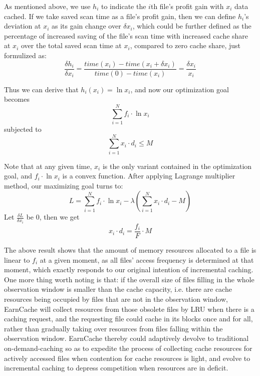 As mentioned above, we use $h_i$ to indicate the $i$th file's profit gain with $x_i$ data cached. If we take saved scan time as a file's profit gain, then we can define $h_i$'s deviation at $x_i$ as its gain change over $\delta x_i$, which could be further defined as the percentage of increased saving of the file's scan time with increased cache share at $x_i$ over the total saved scan time at $x_i$, compared to zero cache share, just formulized as:
\begin{equation}\label{dhi}
\frac{\delta h_i}{\delta x_i}=\frac{time(x_i) - time(x_i+\delta x_i)}{time(0) - time(x_i)}=\frac{\delta x_i}{x_i}
\end{equation}

Thus we can derive that $h_i(x_i)=\ln x_i$, and now our optimization goal becomes
\begin{equation}
\sum_{i=1}^{N} f_i \cdot \ln x_i
\end{equation}
subjected to
\begin{equation}
\sum_{i=1}^{N} x_i\cdot d_i \leq M
\end{equation}

Note that at any given time,  $x_i$ is the only variant contained in the optimization goal, and $f_i \cdot \ln x_i$ is a convex function. After applying Lagrange multiplier method, our maximizing goal turns to:
\begin{equation}
L=\sum_{i=1}^{N} f_i\cdot \ln x_i - \lambda (\sum_{i=1}^{N} x_i\cdot d_i - M)
\end{equation}
Let $\frac{\delta L}{\delta x_i}$ be 0, then we get
\begin{equation}\label{xi result}
x_i\cdot d_i= \frac{f_i}{F} \cdot M
\end{equation}

The above result shows that the amount of memory resources allocated to a file is linear to $f_i$ at a given moment, as all files' access frequency is determined at that moment, which exactly responds to our original intention of incremental caching. 
One more thing worth noting is that: if the overall size of files filling in the whole observation window is smaller than the cache capacity, i.e. there are cache resources being occupied by files that are not in the observation window, EarnCache will collect resources from those obsolete files by LRU when there is a caching request,
and the requesting file could cache in its blocks once and for all, rather than gradually taking over resources from files falling within the observation window. 
EarnCache thereby could adaptively devolve to traditional on-demand-caching so as to expedite the process of collecting cache resources for actively accessed files 
when contention for cache resources is light, and evolve to incremental caching to depress competition when resources are in deficit.

